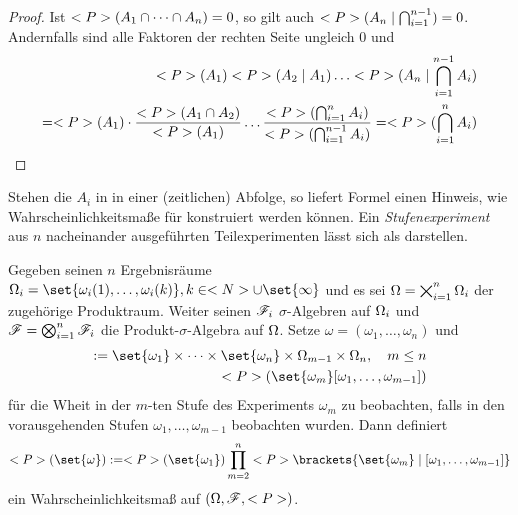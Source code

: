 \begin{proof}
	Ist $\P(A_1 \cap \dots \cap A_n) = 0$, so gilt auch $\P(A_n \mid \bigcap_{i=1}^{n-1}) = 0$. Andernfalls sind alle Faktoren der rechten Seite ungleich 0 und
	\begin{align*}
		\P(A_1)\P(A_2 \mid A_1) \dots \P(A_n \mid \bigcap_{i=1}^{n-1} A_i) \\
		= \P(A_1) \cdot \frac{\P(A_1 \cap A_2)}{\P(A_1)} \dots \frac{\P(\bigcap_{i=1}^{n} A_i)}{\P(\bigcap_{i=1}^{n-1}A_i)} = \P(\bigcap_{i=1}^n A_i)	
	\end{align*}
\end{proof} %
Stehen die $A_i$ in  in einer (zeitlichen) Abfolge, so liefert Formel einen Hinweis, wie Wahrscheinlichkeitsmaße für  konstruiert werden können. Ein \emph{Stufenexperiment} aus $n$ nacheinander ausgeführten Teilexperimenten lässt sich als  darstellen.


\begin{proposition}
	Gegeben seinen $n$ Ergebnisräume $\O_i = \set{\omega_i (1), \dots, \omega_i (k)}, k \in \N \cup \set{\infty}$ und es sei $\O = \bigtimes_{i = 1}^n \O_i$ der zugehörige Produktraum. Weiter seinen $\F_i$ $\sigma$-Algebren auf $\O_i$ und $\F = \bigotimes_{i=1}^n \F_i$ die Produkt-$\sigma$-Algebra auf $\O$. Setze $\omega = (\omega_1,\dots,\omega_n)$ und
	\begin{align*}
		[\omega_1,\dots,\omega_n]:= \set{\omega_1}\times \dots \times \set{\omega_n} \times \O_{m-1} \times \O_{n},\quad m\le n\\
		\P(\set{\omega_m}[\omega_1,\dots,\omega_{m-1}])
	\end{align*} %
	für die Wheit in der $m$-ten Stufe des Experiments $\omega_m$ zu beobachten, falls in den vorausgehenden Stufen $\omega_1,\dots,\omega_{m-1}$ beobachten wurden. Dann definiert
	\begin{align*}
		\P(\set{\omega}) := \P(\set{\omega_1})\prod_{m=2}^{n}\P\brackets{\set{\omega_m} \mid [\omega_1, \dots, \omega_{m-1}]}
	\end{align*}
	ein Wahrscheinlichkeitsmaß auf $(\O, \F, \P)$.
\end{proposition}

